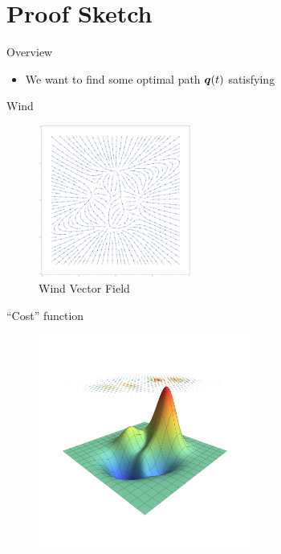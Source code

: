\documentclass{fkpresentation}
\begin{document}

\section{Proof Sketch}

\begin{frame}{Overview}
  \begin{itemize}
    \item We want to find some optimal path $\bm q(t)$ satisfying
  \end{itemize}
\end{frame}

\begin{frame}{Wind}
  \begin{figure}[h]
    \centering
    \includegraphics[keepaspectratio,height=5cm]{figures/vector-field.pdf}
    \caption{Wind Vector Field}
    \label{fig:wind}
  \end{figure}
\end{frame}

\begin{frame}{``Cost'' function}
  \begin{figure}[h]
    \centering
    \includegraphics[keepaspectratio,height=7cm]{figures/vect-to-scalar.pdf}
  \end{figure}
\end{frame}
\end{document}
